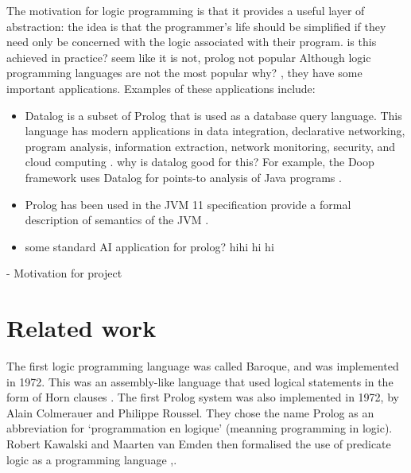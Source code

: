 \documentclass[12pt,a4paper]{report}
\begin{document}
 The motivation for logic programming is that it provides a useful layer of abstraction: the idea is that the programmer's life should be simplified if they need only be concerned with the logic associated with their program. {\color{red}  is this achieved in practice? seem like it is not, prolog not popular} Although logic programming languages are not the most popular {\color{red} why? }, they have some important applications. Examples of these applications include:
 \begin{itemize}
\item Datalog is a subset of Prolog that is used as a database query language. This language has modern applications in 
data integration, declarative networking, program analysis, information extraction,
network monitoring, security, and cloud computing \cite{datalog}. {\color{red} why is datalog good for this?} For example, the Doop framework uses Datalog for points-to analysis of Java programs \cite{doop}.

\item 
Prolog has been used in the JVM 11 specification  provide a formal description of semantics of the JVM \cite{jvm11}.

\item {\color{red} some standard AI application for prolog? hihi hi hi}


 \end{itemize}







- Motivation for project

\section{Related work}

The first logic programming language was called Baroque, and was implemented in 1972. This was an  assembly-like language that used logical statements in the form of Horn clauses \cite{Kowalski2002}. The first Prolog system was also implemented in 1972, by Alain Colmerauer and Philippe Roussel. They chose the name Prolog as an abbreviation for `programmation en logique' (meanning programming in logic).
 Robert Kawalski and Maarten van Emden then formalised the use of predicate logic as a programming language \cite{kowalski},\cite{logprog}.
\end{document}
